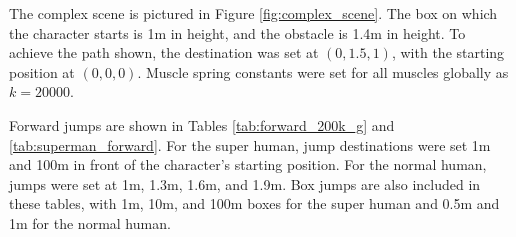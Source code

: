 The complex scene is pictured in Figure \ref{fig:complex_scene}.  The box on which the character starts is 1m in height, and the obstacle is 1.4m in height.  To achieve the path shown, the destination was set at $(0, 1.5, 1)$, with the starting position at $(0, 0, 0)$.  Muscle spring constants were set for all muscles globally as $k=20000$.

Forward jumps are shown in Tables \ref{tab:forward_200k_g} and \ref{tab:superman_forward}. For the super human, jump destinations were set 1m and 100m in front of the character's starting position.  For the normal human, jumps were set at 1m, 1.3m, 1.6m, and 1.9m.  Box jumps are also included in these tables, with 1m, 10m, and 100m boxes for the super human and 0.5m and 1m for the normal human.  

\newcommand{\floatedfig}[1]{\begin{subfigure}[h]{0.2\textwidth}\vspace{1mm}\texttt{[image: \#1]}\vspace{1mm}\end{subfigure}\hspace{0.025\textwidth}}
\newcommand{\framesubfig}[1]{\begin{subfigure}[h]{0.24\textwidth}\texttt{[image: \#1]}\end{subfigure}}

